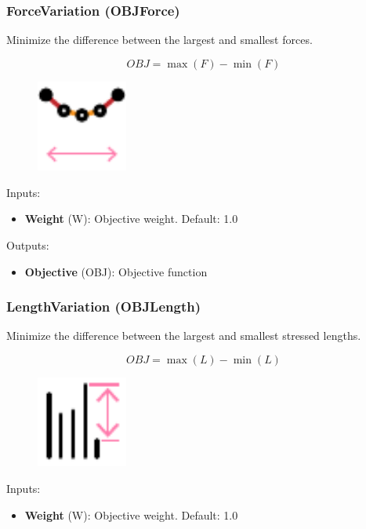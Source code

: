 \subsubsection{ForceVariation (OBJForce)} \label{OBJForce}
Minimize the difference between the largest and smallest forces.

$$
OBJ = \max(F) - \min(F)
$$

\begin{figure}[h]
    \centering
    \includegraphics[width=3cm]{Figures/Force var}
\end{figure}

Inputs:
\begin{itemize}
    \setlength\itemsep{0.05em}
    \item \textbf{Weight} (W): Objective weight. {\color{gray} Default: 1.0}
\end{itemize}

Outputs:
\begin{itemize}
    \setlength\itemsep{0.05em}
    \item \textbf{Objective} (OBJ): Objective function
\end{itemize}

\subsubsection{LengthVariation (OBJLength)} \label{OBJLength}
Minimize the difference between the largest and smallest stressed lengths.

$$
OBJ = \max(L) - \min(L)
$$

\begin{figure}[h]
    \centering
    \includegraphics[width=3cm]{Figures/length var}
\end{figure}

Inputs:
\begin{itemize}
    \setlength\itemsep{0.05em}
    \item \textbf{Weight} (W): Objective weight. {\color{gray} Default: 1.0}
\end{itemize}

